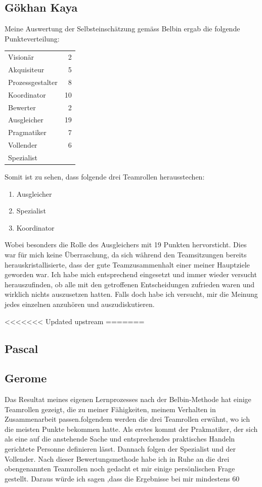 \subsection*{Gökhan Kaya}

Meine Auswertung der Selbsteinschätzung gemäss Belbin ergab die folgende Punkteverteilung:

\begin{tabular}{lr}
  Visionär & 2 \\ 
  Akquisiteur & 5 \\ 
  Prozessgestalter & 8 \\ 
  Koordinator & 10 \\ 
  Bewerter & 2 \\
  Ausgleicher & 19 \\
  Pragmatiker & 7 \\
  Vollender & 6 \\
  Spezialist & \\
\end{tabular}
\newline


Somit ist zu sehen, dass folgende drei Teamrollen herausstechen:
\begin{enumerate} 
\item Ausgleicher 
\item Spezialist
\item Koordinator
\end{enumerate}

Wobei besonders die Rolle des Ausgleichers mit 19 Punkten hervorsticht. Dies war für mich keine Überraschung, da sich während den Teamsitzungen bereits herauskristallisierte, dass der gute Teamzusammenhalt einer meiner Hauptziele geworden war. Ich habe mich entsprechend eingesetzt und immer wieder versucht herauszufinden, ob alle mit den getroffenen Entscheidungen zufrieden waren und wirklich nichts auszusetzen hatten. Falls doch habe ich versucht, mir die Meinung jedes einzelnen anzuhören und auszudiskutieren. 

<<<<<<< Updated upstream
=======
\subsection*{Pascal}

\subsection*{Gerome}
Das Resultat meines eigenen Lernprozesses nach der Belbin-Methode hat einige Teamrollen gezeigt, die zu meiner Fähigkeiten, 
meinem Verhalten in Zusammenarbeit passen.folgendem werden die drei Teamrollen erwähnt, wo ich die meisten Punkte bekommen hatte.
Als erstes kommt der Prakmatiker, der sich als eine auf die anstehende Sache und entsprechendes praktisches Handeln gerichtete Personne definieren lässt. Dannach folgen der Spezialist und der Vollender.
\newline
Nach dieser Bewertungsmethode habe ich in Ruhe an die drei obengenannten Teamrollen noch gedacht et mir einige persönlischen Frage gestellt. Daraus würde ich sagen ,dass die Ergebnisse  bei mir mindestens 60%

